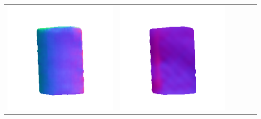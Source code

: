 \begin{tabularx}{\linewidth}{@{}Y@{}Y@{}Y@{}Y@{}Y@{}Y@{}}
\includegraphics[width=\linewidth]{semisynthetic/20150514_18_marrnet_out.png} &
\includegraphics[width=\linewidth]{semisynthetic/20150514_18_ef_out.png} \\

\end{tabularx}
